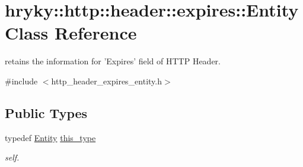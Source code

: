 \hypertarget{classhryky_1_1http_1_1header_1_1expires_1_1_entity}{\section{hryky\-:\-:http\-:\-:header\-:\-:expires\-:\-:Entity Class Reference}
\label{classhryky_1_1http_1_1header_1_1expires_1_1_entity}
}


retains the information for 'Expires' field of H\-T\-T\-P Header.  




{\ttfamily \#include $<$http\-\_\-header\-\_\-expires\-\_\-entity.\-h$>$}

\subsection*{Public Types}
\begin{DoxyCompactItemize}
\item 
\hypertarget{classhryky_1_1http_1_1header_1_1expires_1_1_entity_a5e5a7c42055d9ada9f441424a82868f8}{typedef \hyperlink{classhryky_1_1http_1_1header_1_1expires_1_1_entity}{Entity} \hyperlink{classhryky_1_1http_1_1header_1_1expires_1_1_entity_a5e5a7c42055d9ada9f441424a82868f8}{this\-\_\-type}}\label{classhryky_1_1http_1_1header_1_1expires_1_1_entity_a5e5a7c42055d9ada9f441424a82868f8}

\begin{DoxyCompactList}\small\item\em self. \end{DoxyCompactList}\end{DoxyCompactItemize}
